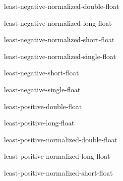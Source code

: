 \begin{constant}{least-negative-normalized-double-float}{}{}{}
  
\end{constant}

\begin{constant}{least-negative-normalized-long-float}{}{}{}
  
\end{constant}

\begin{constant}{least-negative-normalized-short-float}{}{}{}
  
\end{constant}

\begin{constant}{least-negative-normalized-single-float}{}{}{}
  
\end{constant}

\begin{constant}{least-negative-short-float}{}{}{}
  
\end{constant}

\begin{constant}{least-negative-single-float}{}{}{}
  
\end{constant}

\begin{constant}{least-positive-double-float}{}{}{}
  
\end{constant}

\begin{constant}{least-positive-long-float}{}{}{}
  
\end{constant}

\begin{constant}{least-positive-normalized-double-float}{}{}{}
  
\end{constant}

\begin{constant}{least-positive-normalized-long-float}{}{}{}
  
\end{constant}

\begin{constant}{least-positive-normalized-short-float}{}{}{}
  
\end{constant}

